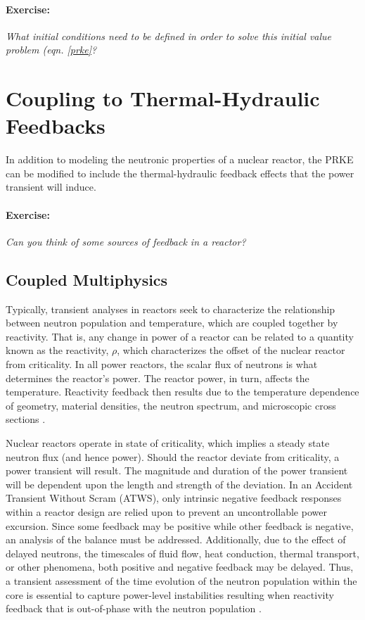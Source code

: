 \documentclass[12pt]{article}
\begin{document}

\paragraph{Exercise:}
\emph{What initial conditions need to be defined in order to solve this initial 
value problem (eqn. \eqref{prke}?}
\section{Coupling to Thermal-Hydraulic Feedbacks}

In addition to modeling
the neutronic properties of a nuclear reactor, the PRKE can be modified to
include the thermal-hydraulic feedback effects that the power transient will
induce.

\paragraph{Exercise:} \emph{Can you think of some sources of feedback in a 
reactor?}

\subsection{Coupled Multiphysics}

Typically, transient analyses in reactors seek to characterize the relationship
between neutron population and temperature, which are coupled together by
reactivity.  That is, any change in power of a reactor can be related to a
quantity known as the reactivity, $\rho$, which characterizes the offset of the
nuclear reactor from criticality. In all power reactors,  the scalar flux of
neutrons is what determines the reactor's power. The reactor power, in turn,
affects the temperature. Reactivity feedback then results due to the temperature
dependence of geometry, material densities, the neutron spectrum, and
microscopic cross sections \cite{bell_nuclear_1970}.

Nuclear reactors operate in state of criticality, which implies a steady state
neutron flux (and hence power).  Should the reactor deviate from criticality, a
power transient will result. The magnitude and duration of the power transient
will be dependent upon the length and strength of the deviation.  In an
Accident Transient Without Scram (ATWS), only intrinsic negative feedback 
responses within a reactor design
are relied upon to prevent an uncontrollable power excursion.  Since some
feedback may be positive while other feedback is negative, an analysis of the
balance must be addressed. Additionally, due to the effect of delayed neutrons,
the timescales of fluid flow, heat conduction, thermal transport, or other
phenomena, both positive and negative feedback may be delayed. Thus, a transient
assessment of the time evolution of the neutron population within the core is
essential to capture power-level instabilities resulting when reactivity
feedback that is out-of-phase with the neutron population
\cite{stacey_nuclear_2007}.
\end{document}
